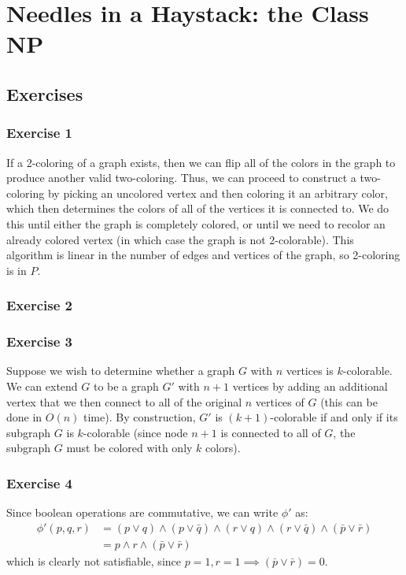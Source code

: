 \section{Needles in a Haystack: the Class NP}

\subsection{Exercises}

\subsubsection{Exercise 1}
If a 2-coloring of a graph exists, then we can flip all of the colors in the graph to produce another valid
two-coloring. Thus, we can proceed to construct a two-coloring by picking an uncolored vertex and then coloring
it an arbitrary color, which then determines the colors of all of the vertices it is connected to. We do
this until either the graph is completely colored, or until we need to recolor an already colored vertex
(in which case the graph is not 2-colorable). This algorithm is linear in the number of edges and vertices of the graph, so 2-coloring is in $P$.

\subsubsection{Exercise 2}

\subsubsection{Exercise 3}
Suppose we wish to determine whether a graph $G$ with  $n$ vertices is  $k$-colorable. We can extend $G$ to
be a graph $G'$ with $n + 1$ vertices by adding an additional vertex that we then connect to all of the original
$n$ vertices of  $G$ (this can be done in  $O(n)$ time). By construction, $G'$ is  $(k + 1)$-colorable if and
only if its subgraph $G$ is $k$-colorable (since node $n + 1$ is connected to all of $G$, the subgraph $G$
must be colored with only $k$ colors). 

\subsubsection{Exercise 4}
Since boolean operations are commutative, we can write $\phi'$ as:
\begin{align*}
        \phi'(p, q, r) &= (p \vee q) \wedge (p \vee \bar{q}) \wedge (r \vee q) \wedge (r \vee \bar{q}) \wedge (\bar{p} \vee \bar{r}) \\
                       &= p \wedge r \wedge (\bar{p} \vee \bar{r})
\end{align*}
which is clearly not satisfiable, since $p = 1, r = 1 \implies (\bar{p} \vee \bar{r}) = 0$.

